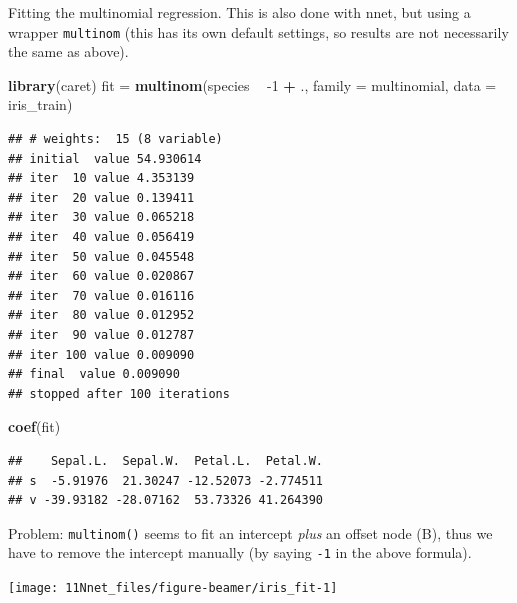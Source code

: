 \documentclass[10pt,ignorenonframetext,]{beamer}
\newenvironment{Shaded}{\begin{snugshade}}{\end{snugshade}}
\newcommand{\DataTypeTok}[1]{\textcolor[rgb]{0.13,0.29,0.53}{#1}}
\newcommand{\DecValTok}[1]{\textcolor[rgb]{0.00,0.00,0.81}{#1}}
\newcommand{\KeywordTok}[1]{\textcolor[rgb]{0.13,0.29,0.53}{\textbf{#1}}}
\newcommand{\NormalTok}[1]{#1}
\newcommand{\OperatorTok}[1]{\textcolor[rgb]{0.81,0.36,0.00}{\textbf{#1}}}
\newcommand{\StringTok}[1]{\textcolor[rgb]{0.31,0.60,0.02}{#1}}
\begin{document}
\begin{frame}[fragile]

Fitting the multinomial regression. This is also done with nnet, but
using a wrapper \texttt{multinom} (this has its own default settings, so
results are not necessarily the same as above).

\scriptsize

\begin{Shaded}
\begin{Highlighting}[]
\KeywordTok{library}\NormalTok{(caret)}
\NormalTok{fit =}\StringTok{ }\KeywordTok{multinom}\NormalTok{(species }\OperatorTok{~}\StringTok{ }\DecValTok{-1} \OperatorTok{+}\StringTok{ }\NormalTok{., }\DataTypeTok{family =}\NormalTok{ multinomial, }\DataTypeTok{data =}\NormalTok{ iris_train)}
\end{Highlighting}
\end{Shaded}

\begin{verbatim}
## # weights:  15 (8 variable)
## initial  value 54.930614 
## iter  10 value 4.353139
## iter  20 value 0.139411
## iter  30 value 0.065218
## iter  40 value 0.056419
## iter  50 value 0.045548
## iter  60 value 0.020867
## iter  70 value 0.016116
## iter  80 value 0.012952
## iter  90 value 0.012787
## iter 100 value 0.009090
## final  value 0.009090 
## stopped after 100 iterations
\end{verbatim}

\begin{Shaded}
\begin{Highlighting}[]
\KeywordTok{coef}\NormalTok{(fit)}
\end{Highlighting}
\end{Shaded}

\begin{verbatim}
##    Sepal.L.  Sepal.W.  Petal.L.  Petal.W.
## s  -5.91976  21.30247 -12.52073 -2.774511
## v -39.93182 -28.07162  53.73326 41.264390
\end{verbatim}

\end{frame}

\begin{frame}[fragile]

Problem: \texttt{multinom()} seems to fit an intercept \emph{plus} an
offset node (B), thus we have to remove the intercept manually (by
saying \texttt{-1} in the above formula).

\begin{center}\texttt{[image: 11Nnet\_files/figure-beamer/iris\_fit-1]} \end{center}

\end{frame}
\end{document}
